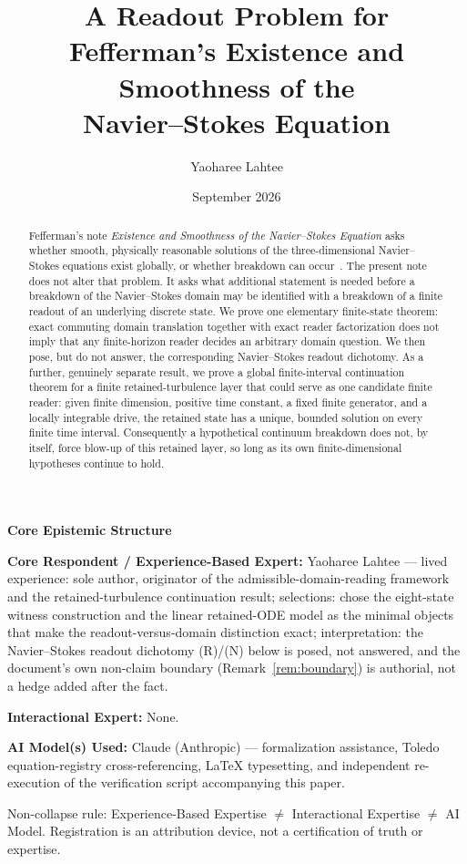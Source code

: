 \documentclass[11pt]{article}
\title{A Readout Problem for Fefferman's Existence and Smoothness of the\\ Navier--Stokes Equation}
\author{Yaoharee Lahtee}
\date{September 2026}
\theoremstyle{plain}
\theoremstyle{definition}
\begin{document}
\maketitle

\noindent\textbf{Core Epistemic Structure}

\noindent\textbf{Core Respondent / Experience-Based Expert:} Yaoharee Lahtee --- lived experience:
sole author, originator of the admissible-domain-reading framework and the retained-turbulence
continuation result; selections: chose the eight-state witness construction and the linear
retained-ODE model as the minimal objects that make the readout-versus-domain distinction exact;
interpretation: the Navier--Stokes readout dichotomy (R)/(N) below is posed, not answered, and the
document's own non-claim boundary (Remark~\ref{rem:boundary}) is authorial, not a hedge added
after the fact.

\noindent\textbf{Interactional Expert:} None.

\noindent\textbf{AI Model(s) Used:} Claude (Anthropic) --- formalization assistance, Toledo
equation-registry cross-referencing, LaTeX typesetting, and independent re-execution of the
verification script accompanying this paper.

\noindent Non-collapse rule: Experience-Based Expertise $\neq$ Interactional Expertise $\neq$ AI
Model. Registration is an attribution device, not a certification of truth or expertise.

\bigskip

\begin{abstract}
Fefferman's note \emph{Existence and Smoothness of the Navier--Stokes Equation} asks whether
smooth, physically reasonable solutions of the three-dimensional Navier--Stokes equations exist
globally, or whether breakdown can occur~\cite{fefferman2006}. The present note does not alter
that problem. It asks what additional statement is needed before a breakdown of the Navier--Stokes
domain may be identified with a breakdown of a finite readout of an underlying discrete state. We
prove one elementary finite-state theorem: exact commuting domain translation together with exact
reader factorization does not imply that any finite-horizon reader decides an arbitrary domain
question. We then pose, but do not answer, the corresponding Navier--Stokes readout dichotomy. As
a further, genuinely separate result, we prove a global finite-interval continuation theorem for a
finite retained-turbulence layer that could serve as one candidate finite reader: given finite
dimension, positive time constant, a fixed finite generator, and a locally integrable drive, the
retained state has a unique, bounded solution on every finite time interval. Consequently a
hypothetical continuum breakdown does not, by itself, force blow-up of this retained layer, so long
as its own finite-dimensional hypotheses continue to hold.
\end{abstract}
\end{document}
